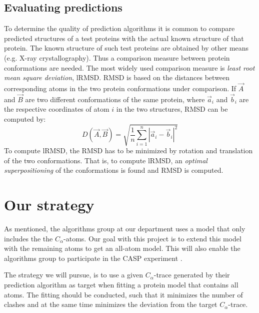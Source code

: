 \subsection{Evaluating predictions}
To determine the quality of prediction algorithms it is common 
to compare predicted structures of a test proteins with the actual
known structure of that protein. The known structure of such test
proteins are obtained by other means (e.g. X-ray crystallography).
Thus a comparison measure between protein conformations are
needed. The most widely used comparison measure is \textit{least root mean
  square deviation}, lRMSD. RMSD is based on the distances between
corresponding atoms in the two protein conformations under comparison.
If $\vec{A}$ and $\vec{B}$ are two different conformations of the same protein,
where $\vec{a}_i$ and $\vec{b}_i$ are the respective coordinates of atom $i$ in the two
structures, RMSD can be computed by:
\begin{equation}
  \label{eq:rmsd}
  D(\vec{A}, \vec{B}) = \sqrt{\frac{1}{n}\sum_{i=1}^n |\vec{a}_i - \vec{b}_i|^2}
\end{equation}
To compute lRMSD, the RMSD has to be minimized by rotation and
translation of the two conformations. That is, to compute lRMSD, an
\textit{optimal superpositioning} of the conformations is found and
RMSD is computed.




\section{Our strategy}
As mentioned, the algorithms group at our department uses a model that
only includes the the $C_\alpha$-atoms. Our goal with this project is
to extend this model with the remaining atoms to get an all-atom
model.  This will also enable the algorithms group to participate in
the CASP experiment \cite{caspwebsite}.

The strategy we will pursue, is to use a given $C_\alpha$-trace
generated by their prediction algorithm as target when fitting a
protein model that contains all atoms. The fitting should be conducted,
such that it minimizes the number of clashes and at the same time
minimizes the deviation from the target $C_\alpha$-trace.

